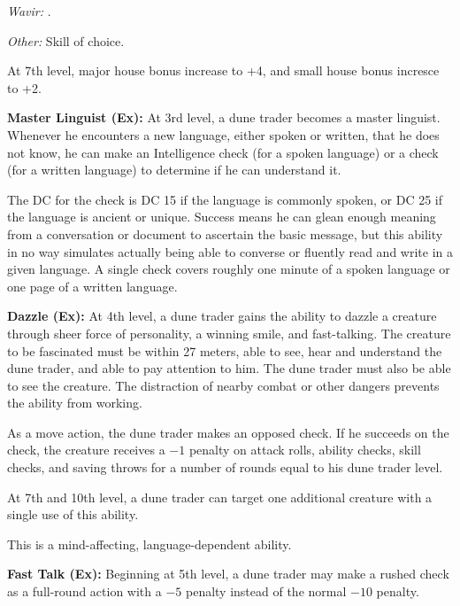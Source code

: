 {\textit{Wavir:} .

\textit{Other:} Skill of choice.

At 7th level, major house bonus increase to +4, and small house bonus incresce to +2.

\textbf{Master Linguist (Ex):} At 3rd level, a dune trader becomes a master linguist. Whenever he encounters a new language, either spoken or written, that he does not know, he can make an Intelligence check (for a spoken language) or a  check (for a written language) to determine if he can understand it.

The DC for the check is DC 15 if the language is commonly spoken, or DC 25 if the language is ancient or unique. Success means he can glean enough meaning from a conversation or document to ascertain the basic message, but this ability in no way simulates actually being able to converse or fluently read and write in a given language. A single check covers roughly one minute of a spoken language or one page of a written language.

\textbf{Dazzle (Ex):} At 4th level, a dune trader gains the ability to dazzle a creature through sheer force of personality, a winning smile, and fast-talking. The creature to be fascinated must be within 27 meters, able to see, hear and understand the dune trader, and able to pay attention to him. The dune trader must also be able to see the creature. The distraction of nearby combat or other dangers prevents the ability from working.

As a move action, the dune trader makes an opposed  check. If he succeeds on the check, the creature receives a $-1$ penalty on attack rolls, ability checks, skill checks, and saving throws for a number of rounds equal to his dune trader level.

At 7th and 10th level, a dune trader can target one additional creature with a single use of this ability.

This is a mind-affecting, language-dependent ability.


\textbf{Fast Talk (Ex):} Beginning at 5th level, a dune trader may make a rushed  check as a full-round action with a $-5$ penalty instead of the normal $-10$ penalty.

}

